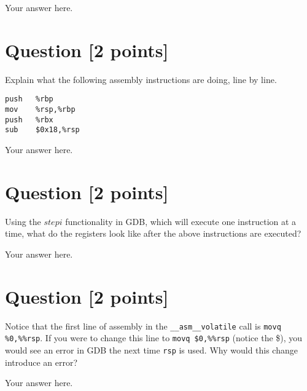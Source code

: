 \documentclass[11pt]{article}
\begin{document}
\begin{solution}
Your answer here.
\end{solution}


\section{Question [2 points]}

Explain what the following assembly instructions are doing, line by line.

\begin{center}
\begin{BVerbatim}
push   %
mov    %
push   %
sub    $0x18,%
\end{BVerbatim}
\end{center}

\begin{solution}
Your answer here.
\end{solution}


\section{Question [2 points]}

Using the $stepi$ functionality in GDB, which will execute one instruction at a time, what do the registers look like after the above instructions are executed?

\begin{solution}
Your answer here.
\end{solution}


\section{Question [2 points]}

Notice that the first line of assembly in the \texttt{\_\_asm\_\_volatile\(\)} call is \texttt{movq \%0,\%\%rsp}. If you were to change this line to \texttt{movq \$0,\%\%rsp} (notice the \$), you would see an error in GDB the next time \texttt{rsp} is used. Why would this change introduce an error?

\begin{solution}
Your answer here.
\end{solution}
\end{document}

